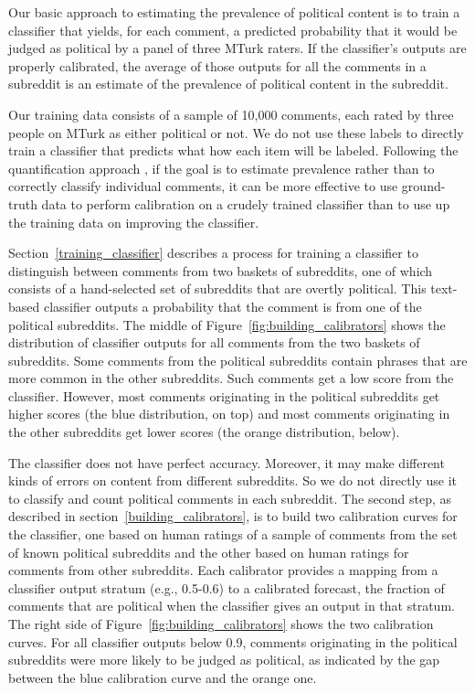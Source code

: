\documentclass[letterpaper]{article} %
\begin{document}
Our basic approach to estimating the prevalence of political content is to train a classifier that yields, for each comment, a predicted probability that it would be judged as political by a panel of three MTurk raters. If the classifier's outputs are properly calibrated, the average of those outputs for all the comments in a subreddit is an estimate of the prevalence of political content in the subreddit.

Our training data consists of a sample of 10,000 comments, each rated by three people on MTurk as either political or not. 
We do not use these labels to directly train a classifier that predicts what how each item will be labeled. Following the quantification approach \cite{forman2006quantifying,gonzalez2017review}, if the goal is to estimate prevalence rather than to correctly classify individual comments, it can be more effective to use ground-truth data to perform calibration on a crudely trained classifier than to use up the training data on improving the classifier.

Section~\ref{training_classifier} describes a process for training a classifier to distinguish between comments from two baskets of subreddits, one of which consists of a hand-selected set of subreddits that are overtly political. This text-based classifier outputs a probability that the comment is from one of the political subreddits. The middle of Figure~\ref{fig:building_calibrators} shows the distribution of classifier outputs for all comments from the two baskets of subreddits. Some comments from the political subreddits contain phrases that are more common in the other subreddits. Such comments get a low score from the classifier. However, most comments originating in the political subreddits get higher scores (the blue distribution, on top) and most comments originating in the other subreddits get lower scores (the orange distribution, below).

The classifier does not have perfect accuracy. Moreover, it may make different kinds of errors on content from different subreddits. So we do not directly use it to classify and count political comments in each subreddit. The second step, as described in section~\ref{building_calibrators}, is to build two calibration curves for the classifier, one based on human ratings of a sample of comments from the set of known political subreddits and the other based on human ratings for comments from other subreddits. Each calibrator provides a mapping from a classifier output stratum (e.g., 0.5-0.6) to a calibrated forecast, the fraction of comments that are political when the classifier gives an output in that stratum. The right side of Figure~\ref{fig:building_calibrators} shows the two calibration curves. For all classifier outputs below 0.9, comments originating in the political subreddits were more likely to be judged as political, as indicated by the gap between the blue calibration curve and the orange one.
\end{document}
